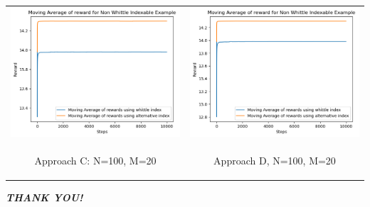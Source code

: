 \documentclass{slides}
\begin{document}
{\begin{center}
\begin{tabular}{cc}
\includegraphics[scale=0.6]{non_whittle_comparison_C.png} &
\includegraphics[scale=0.6]{non_whittle_comparison_D.png} \\
\begin{small}
 Approach C: N=100, M=20\end{small} & \begin{small}Approach D, N=100, M=20\end{small}\\
 \end{tabular}

\end{center}
\newpage
\vspace{.75in}
\begin{center}
\textit{\textbf{\LARGE \color{red} THANK YOU! }}
\end{center}
}
\end{document}
